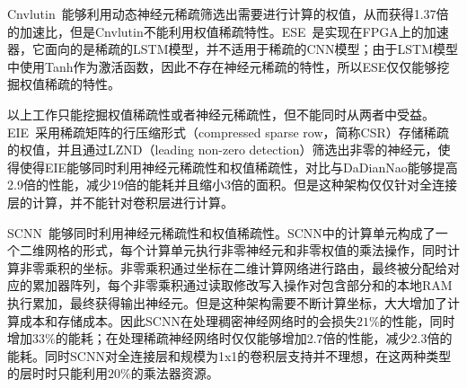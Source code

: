 Cnvlutin~\cite{albericio2016cnvlutin}能够利用动态神经元稀疏筛选出需要进行计算的权值，从而获得1.37倍的加速比，但是Cnvlutin不能利用权值稀疏特性。ESE~\cite{han2017ese}是实现在FPGA上的加速器，它面向的是稀疏的LSTM模型，并不适用于稀疏的CNN模型；由于LSTM模型中使用Tanh作为激活函数，因此不存在神经元稀疏的特性，所以ESE仅仅能够挖掘权值稀疏的特性。

以上工作只能挖掘权值稀疏性或者神经元稀疏性，但不能同时从两者中受益。EIE~\cite{han2016eie}采用稀疏矩阵的行压缩形式（compressed sparse row，简称CSR）存储稀疏的权值，并且通过LZND（leading non-zero detection）筛选出非零的神经元，使得使得EIE能够同时利用神经元稀疏性和权值稀疏性，对比与DaDianNao能够提高2.9倍的性能，减少19倍的能耗并且缩小3倍的面积。但是这种架构仅仅针对全连接层的计算，并不能针对卷积层进行计算。

SCNN~\cite{angshuman2017scnn}能够同时利用神经元稀疏性和权值稀疏性。SCNN中的计算单元构成了一个二维网格的形式，每个计算单元执行非零神经元和非零权值的乘法操作，同时计算非零乘积的坐标。非零乘积通过坐标在二维计算网络进行路由，最终被分配给对应的累加器阵列，每个非零乘积通过读取修改写入操作对包含部分和的本地RAM执行累加，最终获得输出神经元。但是这种架构需要不断计算坐标，大大增加了计算成本和存储成本。因此SCNN在处理稠密神经网络时的会损失$21\%$的性能，同时增加$33\%$的能耗；在处理稀疏神经网络时仅仅能够增加2.7倍的性能，减少2.3倍的能耗。同时SCNN对全连接层和规模为1x1的卷积层支持并不理想，在这两种类型的层时时只能利用$20\%$的乘法器资源。
 
